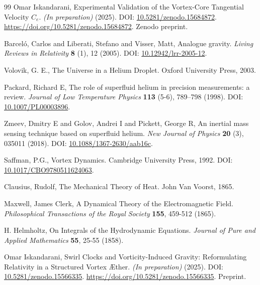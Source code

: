 \documentclass[preprint]{revtex4-2}
\begin{document}
\begin{thebibliography}{99}
Omar Iskandarani,
\newblock Experimental Validation of the Vortex-Core Tangential Velocity $C_e$.
\textit{(In preparation)} (2025).
\newblock DOI: \href{https://doi.org/10.5281/zenodo.15684872}{10.5281/zenodo.15684872}.
\newblock \url{https://doi.org/10.5281/zenodo.15684872}.
\newblock Zenodo preprint.


Barcel\'o, Carlos and Liberati, Stefano and Visser, Matt,
\newblock Analogue gravity.
\textit{Living Reviews in Relativity} \textbf{8} (1), 12 (2005).
\newblock DOI: \href{https://doi.org/10.12942/lrr-2005-12}{10.12942/lrr-2005-12}.


Volovik, G. E.,
\newblock The Universe in a Helium Droplet.
\newblock Oxford University Press, 2003.


Packard, Richard E,
\newblock The role of superfluid helium in precision measurements: a review.
\textit{Journal of Low Temperature Physics} \textbf{113} (5-6), 789--798 (1998).
\newblock DOI: \href{https://doi.org/10.1007/PL00003896}{10.1007/PL00003896}.


Zmeev, Dmitry E and Golov, Andrei I and Pickett, George R,
\newblock An inertial mass sensing technique based on superfluid helium.
\textit{New Journal of Physics} \textbf{20} (3), 035011 (2018).
\newblock DOI: \href{https://doi.org/10.1088/1367-2630/aab16c}{10.1088/1367-2630/aab16c}.


Saffman, P.G.,
\newblock Vortex Dynamics.
\newblock Cambridge University Press, 1992.
\newblock DOI: \href{https://doi.org/10.1017/CBO9780511624063}{10.1017/CBO9780511624063}.


Clausius, Rudolf,
\newblock The Mechanical Theory of Heat.
\newblock John Van Voorst, 1865.


Maxwell, James Clerk,
\newblock A Dynamical Theory of the Electromagnetic Field.
\textit{Philosophical Transactions of the Royal Society} \textbf{155}, 459-512 (1865).


H. Helmholtz,
\newblock On Integrals of the Hydrodynamic Equations.
\textit{Journal of Pure and Applied Mathematics} \textbf{55}, 25-55 (1858).


Omar Iskandarani,
\newblock Swirl Clocks and Vorticity-Induced Gravity: Reformulating Relativity in a Structured Vortex Æther.
\textit{(In preparation)} (2025).
\newblock DOI: \href{https://doi.org/10.5281/zenodo.15566335}{10.5281/zenodo.15566335}.
\newblock \url{https://doi.org/10.5281/zenodo.15566335}.
\newblock Preprint.



\end{thebibliography}
\end{document}
